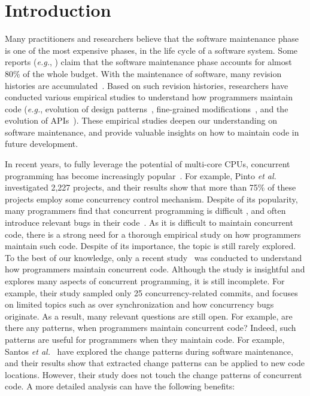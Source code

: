 \section{Introduction}
\label{sec:intro}
Many practitioners and researchers believe that the software maintenance phase is one of the most expensive phases, in the life cycle of a software system. Some reports (\emph{e.g.}, \cite{ahn2003software}) claim that the software maintenance phase accounts for almost 80\% of the whole budget. With the maintenance of software, many revision histories are accumulated~\cite{conf/icsm/Borges16}. Based on such revision histories, researchers have conducted various empirical studies to understand how programmers maintain code (\emph{e.g.}, evolution of design patterns~\cite{aversano2007empirical}, fine-grained modifications~\cite{german2006empirical}, and the evolution of APIs~\cite{mcdonnell2013empirical}). These empirical studies deepen our understanding on software maintenance, and provide valuable insights on how to maintain code in future development.

In recent years, to fully leverage the potential of multi-core CPUs, concurrent programming has become increasingly popular~\cite{journals/jss/PintoTFFB15}. For example, Pinto \emph{et al.}~\cite{journals/jss/PintoTFFB15} investigated 2,227 projects, and their results show that more than 75\% of these projects employ some concurrency control mechanism. Despite of its popularity, many programmers find that concurrent programming is difficult \cite{journals/corr/McKenney17}, and often introduce relevant bugs in their code~\cite{conf/asplos/LuPSZ08}. As it is difficult to maintain concurrent code, there is a strong need for a thorough empirical study on how programmers maintain such code. Despite of its importance, the topic is still rarely explored. To the best of our knowledge, only a recent study~\cite{conf/sigsoft/GuJSZL15} was conducted to understand how programmers maintain concurrent code. Although the study is insightful and explores many aspects of concurrent programming, it is still incomplete. For example, their study sampled only 25 concurrency-related commits, and focuses on limited topics such as over synchronization and how concurrency bugs originate. As a result, many relevant questions are still open. For example, are there any patterns, when programmers maintain concurrent code? Indeed, such patterns are useful for programmers when they maintain code. For example, Santos \emph{et al.}~\cite{conf/icsm/SantosAEDV15} have explored the change patterns during software maintenance, and their results show that extracted change patterns can be applied to new code locations. However, their study does not touch the change patterns of concurrent code. A more detailed analysis can have the following benefits:



